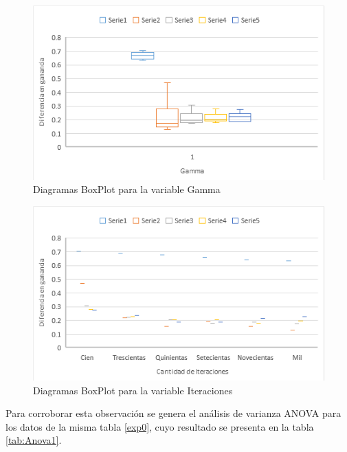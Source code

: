 \begin{figure} [H]
	\centering
	\includegraphics[scale=1]{Cajas1.png}
	\caption{Diagramas BoxPlot para la variable Gamma}
	\label{Cajas1}
\end{figure}

\begin{figure} [H]
	\centering
	\includegraphics[scale=1]{Cajas1_1.png}
	\caption{Diagramas BoxPlot para la variable Iteraciones}
	\label{Cajas1_1}
\end{figure}

Para corroborar esta observación se genera el análisis de varianza ANOVA para los datos de la misma tabla \ref{exp0}, cuyo resultado se presenta en la tabla \ref{tab:Anova1}. 

